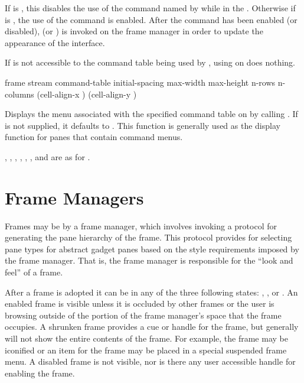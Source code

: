 If  is , this disables the use of the command named by
 while in the  .  Otherwise if
 is , the use of the command is enabled.  After the
command has been enabled (or disabled),  (or
) is invoked on the frame manager in order to update
the appearance of the interface.

If  is not accessible to the command table being used by
, using  on  does nothing.


 {frame stream
                                    \key command-table initial-spacing
                                         max-width max-height n-rows n-columns
                                         (cell-align-x ) (cell-align-y )}

Displays the menu associated with the specified command table on  by
calling .  If  is not
supplied, it defaults to .  This function
is generally used as the display function for panes that contain command menus.

, , , , ,
, and  are as for .


\section {Frame Managers}

Frames may be  by a frame manager, which involves invoking a
protocol for generating the pane hierarchy of the frame.  This protocol provides
for selecting pane types for abstract gadget panes based on the style
requirements imposed by the frame manager.  That is, the frame manager is
responsible for the ``look and feel'' of a frame.

After a frame is adopted it can be in any of the three following states:
, , or .  An enabled frame is
visible unless it is occluded by other frames or the user is browsing outside of
the portion of the frame manager's space that the frame occupies.  A shrunken
frame provides a cue or handle for the frame, but generally will not show the
entire contents of the frame.  For example, the frame may be iconified or an
item for the frame may be placed in a special suspended frame menu.  A disabled
frame is not visible, nor is there any user accessible handle for enabling the
frame.

